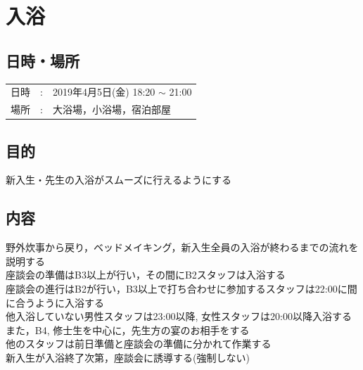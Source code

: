 %
\section{入浴}


\subsection{日時・場所}
\begin{tabular}{p{}rp{}}
  日時 & : & 2019年4月5日(金) 18:20 $\sim$ 21:00\\
  場所 & : & 大浴場，小浴場，宿泊部屋
\end{tabular}


\subsection{目的}
新入生・先生の入浴がスムーズに行えるようにする

\subsection{内容}
野外炊事から戻り，ベッドメイキング，新入生全員の入浴が終わるまでの流れを説明する \\
座談会の準備はB3以上が行い，その間にB2スタッフは入浴する \\
座談会の進行はB2が行い，B3以上で打ち合わせに参加するスタッフは22:00に間に合うように入浴する \\
他入浴していない男性スタッフは23:00以降, 女性スタッフは20:00以降入浴する \\
また，B4, 修士生を中心に，先生方の宴のお相手をする \\
他のスタッフは前日準備と座談会の準備に分かれて作業する \\
新入生が入浴終了次第，座談会に誘導する(強制しない) \\

